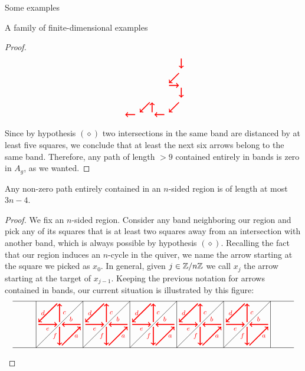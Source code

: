 \begin{chapter}{Some examples}
\begin{section}{A family of finite-dimensional examples}
\begin{proof}
\[\begin{tikzpicture}
\draw[->, red, very thick] (0.5*1.25, 1.5*1.25 - 0.1) -- (0.5*1.25, 1.25 + 0.1);
\draw[->, red, very thick] (0.5*1.25 - 0.1, 1.25-0.1) -- (0.1, 0.5*1.25+0.1);
\draw[->, red, very thick] (0.1, 0.5*1.25) -- (0.5*1.25 - 0.1, 0.5*1.25);
\draw[->, red, very thick] (0.5*1.25, 0.5*1.25-0.1) -- (0.5*1.25, 0.1);
\draw[->, red, very thick] (0.5*1.25 - 0.1, -0.1) -- (0.1, -0.5*1.25+0.1);
\draw[->, red, very thick] (-0.1, -0.5*1.25) -- (-0.5*1.25+0.1, -0.5*1.25);
\draw[->, red, very thick] (-0.5*1.25, -0.5*1.25+0.1) -- (-0.5*1.25, -0.1);
\draw[->, red, very thick] (-0.5*1.25 - 0.1, -0.1) -- (-1.25 + 0.1, -0.5*1.25+0.1);
\draw[->, red, very thick] (-1.25 -0.1, -0.5*1.25) -- (-1.5*1.25+0.1, -0.5*1.25);
\end{tikzpicture}
\]

Since by hypothesis \hyperref[diamondhyp]{$(\diamond)$} two intersections in the same band are distanced by at least five squares, we conclude that at least the next six arrows belong to the same band. Therefore, any path of length $>9$ contained entirely in bands is zero in $A_g$, as we wanted.
\end{proof}

\begin{lemma}\label{long-region-paths} Any non-zero path entirely contained in an $n$-sided region is of length at most $3n-4$.
\end{lemma}
\begin{proof} We fix an $n$-sided region. Consider any band neighboring our region and pick any of its squares that is at least two squares away from an intersection with another band, which is always possible by hypothesis \hyperref[diamondhyp]{$(\diamond)$}. Recalling the fact that our region induces an $n$-cycle in the quiver, we name the arrow starting at the square we picked as $x_0$. In general, given $j\in \mathbb{Z}/n\mathbb{Z}$ we call $x_j$ the arrow starting at the target of $x_{j-1}$. Keeping the previous notation for arrows contained in bands, our current situation is illustrated by this figure:
\[
\begin{tikzpicture}[text width=1.5mm, font=\footnotesize]
\draw (-6, 0) -- (6, 0);
\draw (-6, 2) -- (6, 2);
\foreach \x in {-5,-3,...,5}
\draw (\x, 0) -- (\x, 2);
\foreach \x in {-5,-3,...,3}
{
\draw (\x,0) -- (\x+2, 2);
\draw [->, red, very thick] (\x+1.9, 1) to node[above] {$b$} (\x+1.1, 1);
\draw[->, red, very thick] (\x+1, 0.9) to node[left]{$f$} (\x+1, 0.1);
\draw[->, red, very thick] (\x+1.1, 0.1) to node[right]{$a$} (\x+1.9, 0.9);
\draw[->, red, very thick] (\x+1, 1.1) to node[right]{$c$} (\x+1, 1.9);
\draw[->, red, very thick] (\x+0.9, 1.9) to node[left]{$d$} (\x+0.1, 1.1);
\draw[->, red, very thick] (\x+0.1, 1) to node[below]{$e$} (\x+0.9, 1);
}


\end{tikzpicture}\]
\end{proof}
\end{section}
\end{chapter}
